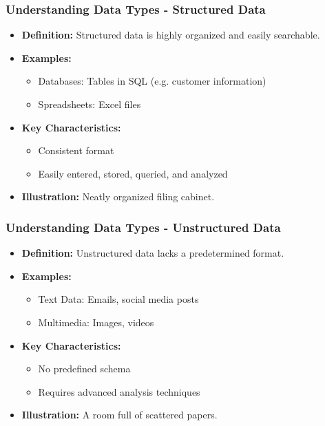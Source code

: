 \documentclass[aspectratio=169]{beamer}
\begin{document}
\begin{frame}[fragile]
    \frametitle{Understanding Data Types - Structured Data}
    \begin{itemize}
        \item \textbf{Definition:} 
            Structured data is highly organized and easily searchable.
        \item \textbf{Examples:}
            \begin{itemize}
                \item Databases: Tables in SQL (e.g. customer information)
                \item Spreadsheets: Excel files
            \end{itemize}
        \item \textbf{Key Characteristics:}
            \begin{itemize}
                \item Consistent format
                \item Easily entered, stored, queried, and analyzed
            \end{itemize}
        \item \textbf{Illustration:} 
            Neatly organized filing cabinet.
    \end{itemize}
\end{frame}

\begin{frame}[fragile]
    \frametitle{Understanding Data Types - Unstructured Data}
    \begin{itemize}
        \item \textbf{Definition:} 
            Unstructured data lacks a predetermined format.
        \item \textbf{Examples:}
            \begin{itemize}
                \item Text Data: Emails, social media posts
                \item Multimedia: Images, videos
            \end{itemize}
        \item \textbf{Key Characteristics:}
            \begin{itemize}
                \item No predefined schema
                \item Requires advanced analysis techniques
            \end{itemize}
        \item \textbf{Illustration:} 
            A room full of scattered papers.
    \end{itemize}
\end{frame}
\end{document}
